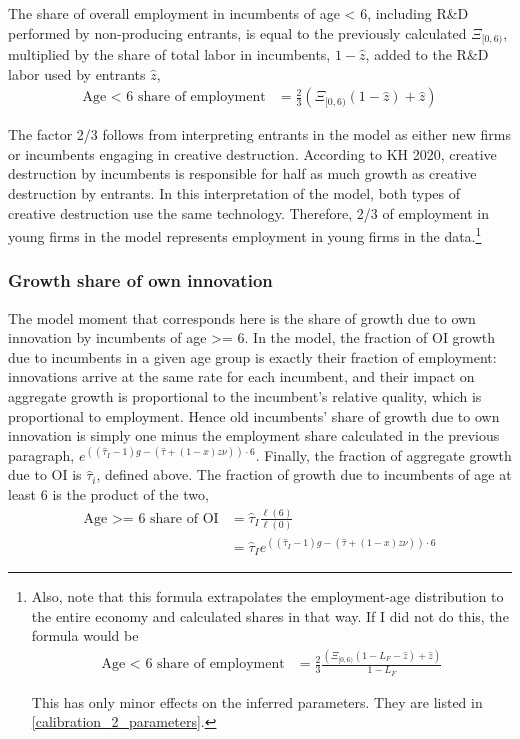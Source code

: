 \documentclass[11pt,english]{article}
\theoremstyle{remark}
\begin{document}
The share of overall employment in incumbents of age < 6, including R\&D performed by non-producing entrants, is equal to the previously calculated $\Xi_{[0,6)}$, multiplied by the share of total labor in incumbents, $1 - \hat{z}$, added to the R\&D labor used by entrants $\hat{z}$, 
\begin{align*}
\textrm{Age < 6 share of employment} &= \frac{2}{3}(\Xi_{[0,6)} (1-\hat{z}) + \hat{z})
\end{align*}

The factor 2/3 follows from interpreting entrants in the model as either new firms or incumbents engaging in creative destruction. According to KH 2020, creative destruction by incumbents is responsible for half as much growth as creative destruction by entrants. In this interpretation of the model, both types of creative destruction use the same technology. Therefore, 2/3 of employment in young firms in the model represents employment in young firms in the data.\footnote{Also, note that this formula extrapolates the employment-age distribution to the entire economy and calculated shares in that way. If I did not do this, the formula would be
	\begin{align*}
	\textrm{Age < 6 share of employment} &= \frac{2}{3} \frac{(\Xi_{[0,6)} (1 - L_F -\hat{z}) + \hat{z})}{1-L_F}
	\end{align*}
	
	This has only minor effects on the inferred parameters. They are listed in \autoref{calibration_2_parameters}.}

\subsubsection{Growth share of own innovation}

The model moment that corresponds here is the share of growth due to own innovation by incumbents of age >= 6. In the model, the fraction of OI growth due to incumbents in a given age group is exactly their fraction of employment: innovations arrive at the same rate for each incumbent, and their impact on aggregate growth is proportional to the incumbent's relative quality, which is proportional to employment. Hence old incumbents' share of growth due to own innovation is simply one minus the employment share calculated in the previous paragraph, $e^{((\hat{\tau}_I -1)g - (\hat{\tau} + (1-x)z \nu))\cdot 6}$. Finally, the fraction of aggregate growth due to OI is $\hat{\tau}_i$, defined above. The fraction of growth due to incumbents of age at least 6 is the product of the two, 
\begin{align*}
\textrm{Age >= 6 share of OI} &= \hat{\tau}_I \frac{\ell(6)}{\ell(0)} \\
 &= \hat{\tau}_I e^{((\hat{\tau}_I -1)g - (\hat{\tau} + (1-x)z \nu))\cdot 6} 
\end{align*}
\end{document}

